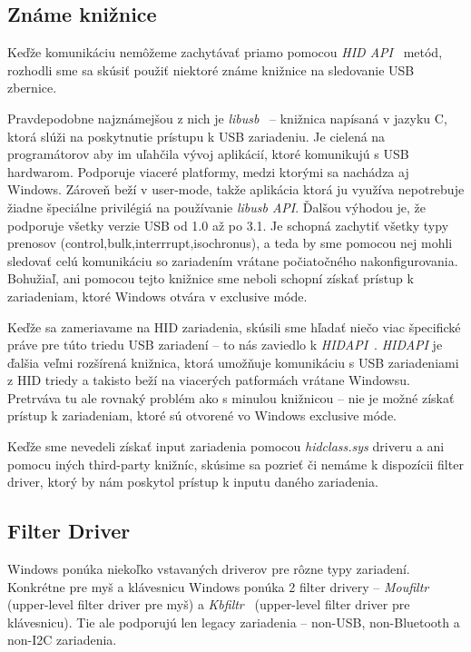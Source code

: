 \subsection*{Známe knižnice}
Keďže komunikáciu nemôžeme zachytávať priamo pomocou \textit{HID API}~\cite{hid_api} metód, rozhodli sme sa skúsiť použiť niektoré známe knižnice na sledovanie USB zbernice. 

Pravdepodobne najznámejšou z nich je \textit{libusb}~\cite{libusb} -- knižnica napísaná v jazyku C, ktorá slúži na poskytnutie prístupu k USB zariadeniu. Je cielená na programátorov aby im uľahčila vývoj aplikácií, ktoré komunikujú s USB hardwarom. Podporuje viaceré platformy, medzi ktorými sa nachádza aj Windows. Zároveň beží v user-mode, takže aplikácia ktorá ju využíva nepotrebuje žiadne špeciálne privilégiá na používanie \textit{libusb API}. Ďalšou výhodou je, že podporuje všetky verzie USB od 1.0 až po 3.1. Je schopná zachytiť všetky typy prenosov (control,bulk,interrrupt,isochronus), a teda by sme pomocou nej mohli sledovať celú komunikáciu so zariadením vrátane počiatočného nakonfigurovania. Bohužiaľ, ani pomocou tejto knižnice sme neboli schopní získať prístup k zariadeniam, ktoré Windows otvára v exclusive móde.

Keďže sa zameriavame na HID zariadenia, skúsili sme hľadať niečo viac špecifické práve pre túto triedu USB zariadení -- to nás zaviedlo k \textit{HIDAPI}~\cite{hidapi_library}. \textit{HIDAPI} je ďalšia veľmi rozšírená knižnica, ktorá umožňuje komunikáciu s USB zariadeniami z HID triedy a takisto beží na viacerých patformách vrátane Windowsu. Pretrváva tu ale rovnaký problém ako s minulou knižnicou -- nie je možné získať prístup k zariadeniam, ktoré sú otvorené vo Windows exclusive móde.

Keďže sme nevedeli získať input zariadenia pomocou \textit{hidclass.sys} driveru a ani pomocu iných third-party knižníc, skúsime sa pozrieť či nemáme k dispozícii filter driver, ktorý by nám poskytol prístup k inputu daného zariadenia.

\subsection*{Filter Driver}
Windows ponúka niekoľko vstavaných driverov pre rôzne typy zariadení. Konkrétne pre myš a klávesnicu Windows ponúka 2 filter drivery -- \textit{Moufiltr}~\cite{moufiltr} (upper-level filter driver pre myš) a \textit{Kbfiltr}~\cite{kbfiltr} (upper-level filter driver pre klávesnicu). Tie ale podporujú len legacy zariadenia -- non-USB, non-Bluetooth a non-I2C zariadenia.

